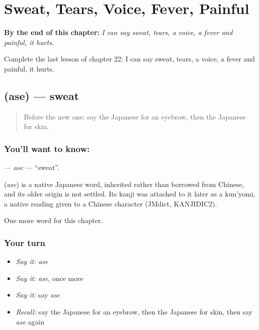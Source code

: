 
\chapter{Sweat, Tears, Voice, Fever, Painful}
\label{ch:ja-sweat-tears-voice-fever-painful}

\begin{chapteropening}
\textbf{By the end of this chapter:} \emph{I can say sweat, tears, a voice, a fever and painful, it hurts.}

Complete the last lesson of chapter 22: I can say sweat, tears, a voice, a fever and painful, it hurts.
\end{chapteropening}

\section[\texorpdfstring{\ja{あせ} (ase)}{あせ (ase)}]{ (ase) — sweat}

\label{lesson:JA-C22-ase}



\begin{quote}
Before the new one: say the Japanese for an eyebrow, then the Japanese for skin.
\end{quote}

\subsection*{You'll want to know: }
\textbf{} — \emph{ase} — \textquotedblleft{}sweat\textquotedblright{}.

\begin{cousinweb}
\textbf{} (\emph{ase}) is a native Japanese word, inherited rather than borrowed from Chinese, and its older origin is not settled. Its kanji was attached to it later as a kun'yomi, a native reading given to a Chinese character (JMdict, KANJIDIC2).
\end{cousinweb}

\begin{grammarlens}[title={What you've built}]
One more word for this chapter.
\end{grammarlens}

\subsection*{Your turn}
\begin{itemize}
\raggedright
  \item \emph{Say it:} \emph{ase}
  \item \emph{Say it:} \emph{ase}, once more
  \item \emph{Say it:} say \emph{ase}
  \item \emph{Recall:} say the Japanese for an eyebrow, then the Japanese for skin, then say \emph{ase} again
\end{itemize}

